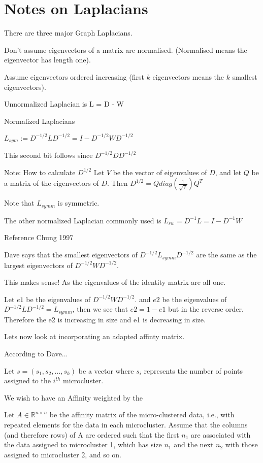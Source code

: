 \documentclass{article}
\begin{document}
\section{Notes on Laplacians}

There are three major Graph Laplacians.

Don't assume eigenvectors of a matrix are normalised. (Normalised means the eigenvector has length one).

Assume eigenvectors ordered increasing (first $k$ eigenvectors means the $k$ smallest eigenvectors).


Unnormalized Laplacian is L = D - W

Normalized Laplacians

$L_{sym} := D^{-1/2}LD^{-1/2} = I - D^{-1/2}WD^{-1/2}$

This second bit follows since $D^{-1/2} D D^{-1/2}$

Note: How to calculate $D^{1/2}$
Let $V$ be the vector of eigenvalues of $D$, and let $Q$ be a matrix of the eigenvectors of $D$. 
Then $D^{1/2} = Q diag(\frac{1}{\sqrt{V}})Q^T$

Note that $L_{symm}$ is symmetric. 

The other normalized Laplacian commonly used is $L_{rw} = D^{-1}L = I - D^{-1}W$

Reference Chung 1997

Dave says that the smallest eigenvectors of $D^{-1/2}L_{symm}D^{-1/2}$ are the same as the largest eigenvectors of $D^{-1/2}WD^{-1/2}$.

This makes sense! As the eigenvalues of the identity matrix are all one. 

Let $e1$ be the eigenvalues of $D^{-1/2}WD^{-1/2}$. and $e2$ be the eigenvalues of $D^{-1/2}LD^{-1/2}  = L_{symm}$, 
then we see that $e2 = 1 - e1$ but in the reverse order. Therefore the e2 is increasing in size and e1 is decreasing in size. 

Lets now look at incorporating an adapted affinty matrix.

According to Dave...

Let $s = (s_1, s_2, \hdots, s_k)$ be a vector where $s_i$ represents the number of points assigned to the $i^{th}$ microcluster.

We wish to have an Affinity weighted by the 

Let $A \in \mathbb{R}^{n \times n}$ be the affinity matrix of the micro-clustered data, i.e., with repeated elements for the data in each microcluster. Assume that the columns (and therefore rows) of A are ordered such that the first $n_1$ are associated with the data assigned to microcluster 1, which has size $n_1$ and the next $n_2$ with those assigned to microcluster 2, and so on.
\end{document}
